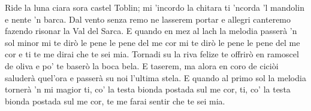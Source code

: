 \beginverse
Ride la luna ciara
sora castel Toblin;
mi 'incordo la chitara
ti 'ncorda 'l mandolin
e nente 'n barca.
\endverse
\beginverse
Dal vento senza remo
ne lasserem portar
e allegri canteremo
fazendo risonar
la Val del Sarca.
\endverse
\beginverse
E quando en mez al lach la melodia
passerà 'n sol minor
mi te dirò le pene le pene del me cor
mi te dirò le pene le pene del me cor
e ti te me dirai che te sei mia.
\endverse
\beginverse
Tornadi su la riva
felize te offrirò
en ramoscel de oliva
e po' te baserò
la boca bela.
\endverse
\beginverse
E taserem, ma alora
en coro de ciciòi
saluderà quel'ora
e passerà su noi
l'ultima stela.
\endverse
\beginverse
E quando al primo sol la melodia
tornerà 'n mi magior
ti, co' la testa bionda postada sul me cor,
ti, co' la testa bionda postada sul me cor,
te me farai sentir che te sei mia.
\endverse
\endsong